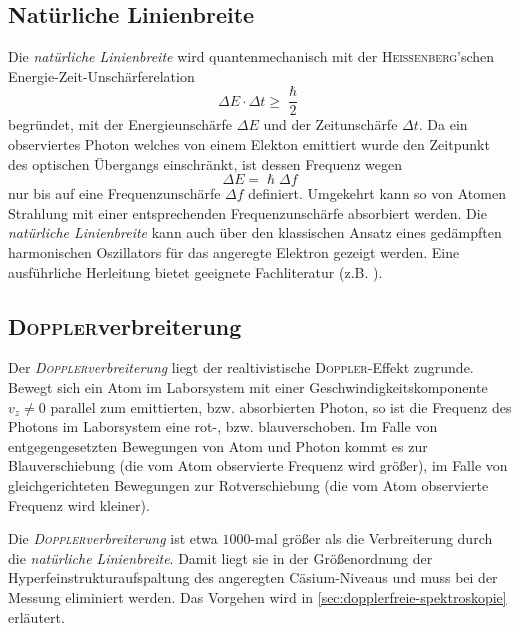 \documentclass[../bericht.tex]{subfiles}
\begin{document}
      \subsection{Nat\"urliche Linienbreite}
      \label{subsec:natürliche-linienbreite}

        Die \textit{nat\"urliche Linienbreite} wird quantenmechanisch mit der \textsc{Hei\ss{}enberg}'schen Energie-Zeit-Unschärferelation
        \begin{equation*}
          \Delta E \cdot \Delta t \ge \frac{\hslash}{2}
        \end{equation*}
        begründet, mit der Energieunschärfe $\Delta E$ und der Zeitunschärfe $\Delta t$. Da ein observiertes Photon welches von einem Elekton emittiert wurde den Zeitpunkt des optischen Übergangs einschränkt, ist dessen Frequenz wegen
        \begin{equation*}
          \Delta E = \hslash \Delta f
        \end{equation*}
        nur bis auf eine Frequenzunschärfe $\Delta f$ definiert. Umgekehrt kann so von Atomen Strahlung mit einer entsprechenden Frequenzunschärfe absorbiert werden. Die \textit{nat\"urliche Linienbreite} kann auch über den klassischen Ansatz eines gedämpften harmonischen Oszillators für das angeregte Elektron gezeigt werden. Eine ausführliche Herleitung bietet geeignete Fachliteratur (z.B. \cite{dem:exp3-linienbreite}).


      \subsection{\textsc{Doppler}verbreiterung}
      \label{subsec:dopplerverbreiterung}

        Der \textit{\textsc{Doppler}verbreiterung} liegt der realtivistische \textsc{Doppler}-Effekt zugrunde. Bewegt sich ein Atom im Laborsystem mit einer Geschwindigkeitskomponente $v_z\ne 0$ parallel zum emittierten, bzw. absorbierten Photon, so ist die Frequenz des Photons im Laborsystem eine rot-, bzw. blauverschoben. Im Falle von entgegengesetzten Bewegungen von Atom und Photon kommt es zur Blauverschiebung (die vom Atom observierte Frequenz wird gr\"o\ss{}er), im Falle von gleichgerichteten Bewegungen zur Rotverschiebung (die vom Atom observierte Frequenz wird kleiner).

        Die \textit{\textsc{Doppler}verbreiterung} ist etwa $1000$-mal gr\"o\ss{}er als die Verbreiterung durch die \textit{nat\"urliche Linienbreite}. Damit liegt sie in der Gr\"o\ss{}enordnung der Hyperfeinstrukturaufspaltung des angeregten Cäsium-Niveaus und muss bei der Messung eliminiert werden. Das Vorgehen wird in \cref{sec:dopplerfreie-spektroskopie} erläutert.
\end{document}
